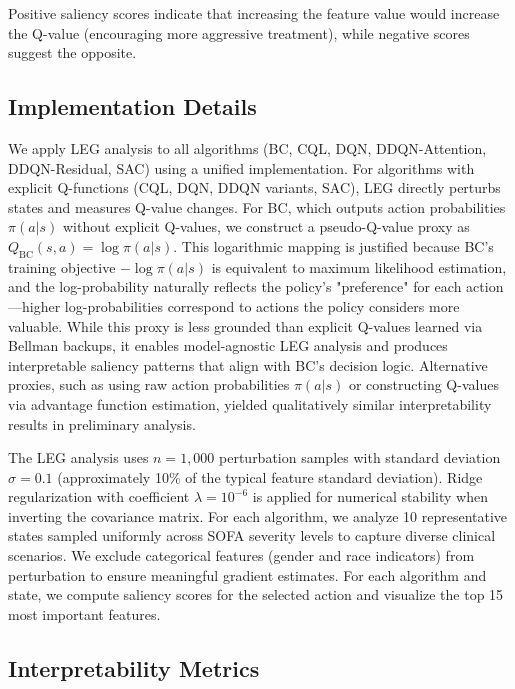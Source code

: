 Positive saliency scores indicate that increasing the feature value would increase the Q-value (encouraging more aggressive treatment), while negative scores suggest the opposite.

\subsection{Implementation Details}

We apply LEG analysis to all algorithms (BC, CQL, DQN, DDQN-Attention, DDQN-Residual, SAC) using a unified implementation. For algorithms with explicit Q-functions (CQL, DQN, DDQN variants, SAC), LEG directly perturbs states and measures Q-value changes. For BC, which outputs action probabilities $\pi(a|s)$ without explicit Q-values, we construct a pseudo-Q-value proxy as $Q_{\text{BC}}(s, a) = \log \pi(a|s)$. This logarithmic mapping is justified because BC's training objective $-\log \pi(a|s)$ is equivalent to maximum likelihood estimation, and the log-probability naturally reflects the policy's "preference" for each action—higher log-probabilities correspond to actions the policy considers more valuable. While this proxy is less grounded than explicit Q-values learned via Bellman backups, it enables model-agnostic LEG analysis and produces interpretable saliency patterns that align with BC's decision logic. Alternative proxies, such as using raw action probabilities $\pi(a|s)$ or constructing Q-values via advantage function estimation, yielded qualitatively similar interpretability results in preliminary analysis.

The LEG analysis uses $n = 1,000$ perturbation samples with standard deviation $\sigma = 0.1$ (approximately 10\% of the typical feature standard deviation). Ridge regularization with coefficient $\lambda = 10^{-6}$ is applied for numerical stability when inverting the covariance matrix. For each algorithm, we analyze 10 representative states sampled uniformly across SOFA severity levels to capture diverse clinical scenarios. We exclude categorical features (gender and race indicators) from perturbation to ensure meaningful gradient estimates. For each algorithm and state, we compute saliency scores for the selected action and visualize the top 15 most important features.

\subsection{Interpretability Metrics}

